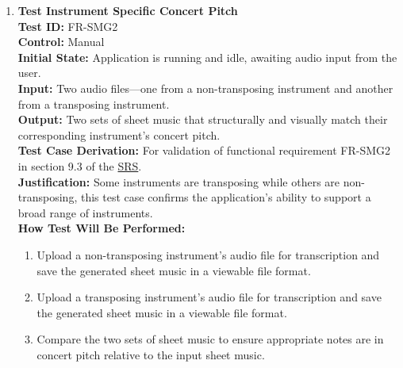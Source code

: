 \documentclass[12pt, titlepage]{article}
\begin{document}
\begin{enumerate}
  \item \textbf{Test Instrument Specific Concert Pitch} \\
    \newline
    \textbf{Test ID:} FR-SMG2 \\
    \textbf{Control:} Manual \\
    \textbf{Initial State:} Application is running and idle, awaiting audio input from the user. \\
    \textbf{Input:} Two audio files—one from a non-transposing instrument and another from a transposing instrument. \\
    \textbf{Output:} Two sets of sheet music that structurally and visually match their corresponding instrument’s concert pitch. \\
    \textbf{Test Case Derivation:} For validation of functional requirement FR-SMG2 in section 9.3 of the 
    \href{https://github.com/emilyperica/ScoreGen/blob/main/docs/SRS-Volere/SRS.pdf}{SRS}. \\
    \textbf{Justification:} Some instruments are transposing while others are non-transposing, this test case confirms the application's 
    ability to support a broad range of instruments.\\
    \textbf{How Test Will Be Performed:}
    \begin{enumerate}
        \item Upload a non-transposing instrument’s audio file for transcription and save the generated sheet music in a 
        viewable file format.
        \item Upload a transposing instrument’s audio file for transcription and save the generated sheet music in a viewable 
        file format.
        \item Compare the two sets of sheet music to ensure appropriate notes are in concert pitch relative to the input sheet music.
    \end{enumerate}
  

\end{enumerate}
\end{document}
